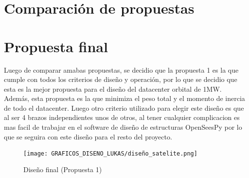\newpage
\section{Comparación de propuestas}


\newpage
\section{Propuesta final}

Luego de comparar amabas propuestas, se decidio que la propuesta 1 es la que cumple con todos los criterios de diseño y operación, por lo que se decidio que esta es la mejor propuesta para el diseño del datacenter orbital de 1MW. Además, esta propuesta es la que minimiza el peso total y el momento de inercia de todo el datacenter. Luego otro criterio utilizado para elegir este diseño es que al ser 4 brazos independientes unos de otros, al tener cualquier complicacion es mas facil de trabajar en el software de diseño de estructuras OpenSeesPy por lo que se seguira con este diseño para el resto del proyecto.

\begin{figure}[H]
    \centering
    \texttt{[image: GRAFICOS\_DISENO\_LUKAS/diseño\_satelite.png]}
    \caption{Diseño final (Propuesta 1)}
    \label{fig:propuesta1}
\end{figure}